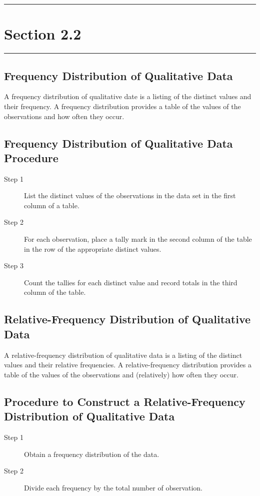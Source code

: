 \documentclass[12pt]{article}
\begin{document}
    \noindent\rule{\textwidth}{0.4pt}
    \section*{Section 2.2}
    \noindent\rule{\textwidth}{0.4pt}
        \subsection*{Frequency Distribution of Qualitative Data}
            A frequency distribution of qualitative date is a listing of the distinct
            values and their frequency. A frequency distribution provides a table of the
            values of the observations and how often they occur.
        \subsection*{Frequency Distribution of Qualitative Data Procedure}
            \begin{description}
                \item[Step 1] List the distinct values of the observations in the data set
                in the first column of a table.
                \item[Step 2] For each observation, place a tally mark in the second column
                of the table in the row of the appropriate distinct values.
                \item[Step 3] Count the tallies for each distinct value and record totals
                in the third column of the table.
            \end{description}
        \subsection*{Relative-Frequency Distribution of Qualitative Data}
            A relative-frequency distribution of qualitative data is a listing of the
            distinct values and their relative frequencies. A relative-frequency
            distribution provides a table of the values of the observations and (relatively)
            how often they occur.
        \subsection*{Procedure to Construct a Relative-Frequency Distribution of Qualitative
        Data}
            \begin{description}
                \item[Step 1] Obtain a frequency distribution of the data.
                \item[Step 2] Divide each frequency by the total number of observation. 
            \end{description}
\end{document}
